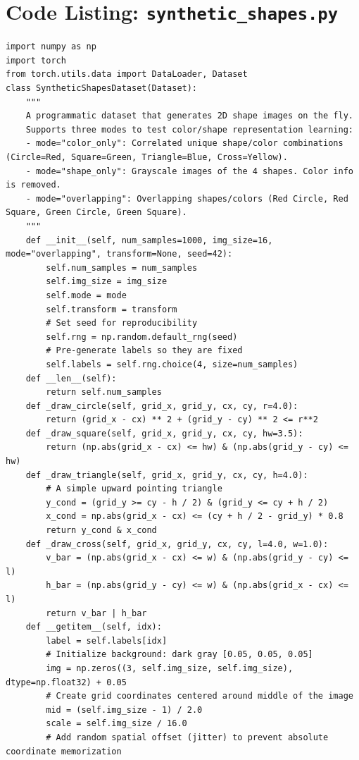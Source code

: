 \documentclass[12pt, a4paper, oneside]{report}
\begin{document}
\section*{Code Listing: \texttt{synthetic\_shapes.py}}
\begin{verbatim}
import numpy as np
import torch
from torch.utils.data import DataLoader, Dataset
class SyntheticShapesDataset(Dataset):
    """
    A programmatic dataset that generates 2D shape images on the fly.
    Supports three modes to test color/shape representation learning:
    - mode="color_only": Correlated unique shape/color combinations (Circle=Red, Square=Green, Triangle=Blue, Cross=Yellow).
    - mode="shape_only": Grayscale images of the 4 shapes. Color info is removed.
    - mode="overlapping": Overlapping shapes/colors (Red Circle, Red Square, Green Circle, Green Square).
    """
    def __init__(self, num_samples=1000, img_size=16, mode="overlapping", transform=None, seed=42):
        self.num_samples = num_samples
        self.img_size = img_size
        self.mode = mode
        self.transform = transform
        # Set seed for reproducibility
        self.rng = np.random.default_rng(seed)
        # Pre-generate labels so they are fixed
        self.labels = self.rng.choice(4, size=num_samples)
    def __len__(self):
        return self.num_samples
    def _draw_circle(self, grid_x, grid_y, cx, cy, r=4.0):
        return (grid_x - cx) ** 2 + (grid_y - cy) ** 2 <= r**2
    def _draw_square(self, grid_x, grid_y, cx, cy, hw=3.5):
        return (np.abs(grid_x - cx) <= hw) & (np.abs(grid_y - cy) <= hw)
    def _draw_triangle(self, grid_x, grid_y, cx, cy, h=4.0):
        # A simple upward pointing triangle
        y_cond = (grid_y >= cy - h / 2) & (grid_y <= cy + h / 2)
        x_cond = np.abs(grid_x - cx) <= (cy + h / 2 - grid_y) * 0.8
        return y_cond & x_cond
    def _draw_cross(self, grid_x, grid_y, cx, cy, l=4.0, w=1.0):
        v_bar = (np.abs(grid_x - cx) <= w) & (np.abs(grid_y - cy) <= l)
        h_bar = (np.abs(grid_y - cy) <= w) & (np.abs(grid_x - cx) <= l)
        return v_bar | h_bar
    def __getitem__(self, idx):
        label = self.labels[idx]
        # Initialize background: dark gray [0.05, 0.05, 0.05]
        img = np.zeros((3, self.img_size, self.img_size), dtype=np.float32) + 0.05
        # Create grid coordinates centered around middle of the image
        mid = (self.img_size - 1) / 2.0
        scale = self.img_size / 16.0
        # Add random spatial offset (jitter) to prevent absolute coordinate memorization

\end{verbatim}
\end{document}
